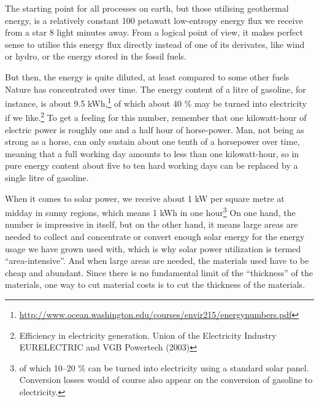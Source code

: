 \documentclass[11pt,bibliography=totoc,index=totoc]{scrbook}   %
\begin{document}

The starting point for all processes on earth, but those utilising geothermal energy, is a relatively constant 100 petawatt low-entropy energy flux we receive from a star 8 light minutes away.
From a logical point of view, it makes perfect sense to utilise this energy flux directly instead of one of its derivates, like wind or hydro, or the energy stored in the fossil fuels. 

But then, the energy is quite diluted, at least compared to some other fuels Nature has concentrated over time.
The energy content of a litre of gasoline, for instance, is about 9.5 kWh,\footnote{\url{http://www.ocean.washington.edu/courses/envir215/energynumbers.pdf}} of which about 40 \% may be turned into electricity if we like.\footnote{Efficiency in electricity generation. Union of the Electricity Industry EURELECTRIC and VGB Powertech (2003)}
To get a feeling for this number, remember that one kilowatt-hour of electric power 
is roughly one and a half hour of horse-power. Man, not being as strong as a
horse, can only sustain about one tenth of a horsepower over time, meaning that a 
full working day amounts to less than one kilowatt-hour, so in pure energy content
about five to ten hard working days can be replaced by a single litre of gasoline.

When it comes to solar power, we receive about 1 kW per square metre at midday in sunny regions, 
which means 1 kWh in one hour\footnote{of which 10–20 \% can be turned into electricity using a standard solar panel. 
Conversion losses would of course also appear on the conversion of gasoline to electricity.}
On one hand, the number is impressive in itself, but on the other hand, 
it means large areas are needed to collect and concentrate or convert enough solar energy for the energy usage we have grown used with,
which is why solar power utilization is termed ``area-intensive''.
And when large areas are needed, the materials used have to be cheap and abundant. 
Since there is no fundamental limit of the ``thickness'' of the materials, one way to cut material costs is to cut the thickness of the materials.
\end{document}
